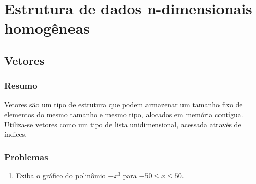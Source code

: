 
\part[Estrutura de dados n-dimensionais homogêneas]
{Estrutura de dados n-dimensionais homogêneas}


\chapter[Vetores]
{Vetores}



\section*{Resumo}

Vetores são um tipo de estrutura que podem armazenar um tamanho fixo de elementos do mesmo tamanho e mesmo tipo, alocados em memória contígua. Utiliza-se vetores como um tipo de lista unidimensional, acessada através de índices.


%
%






\section*{Problemas}

\begin{enumerate}
\item
  Exiba o gráfico do polinômio $-x^3$ para $-50 \leq x \leq 50$.
  \label{ex:cap02_ex1}
\end{enumerate}

